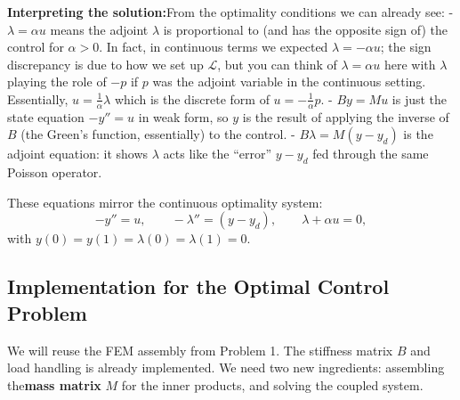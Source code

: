 \textbf{Interpreting the solution:}From the optimality conditions we can already see:
- \(\lambda = \alpha u\) means the adjoint \(\lambda\) is proportional to (and has the opposite sign of) the control for \(\alpha>0\). In fact, in continuous terms we expected \(\lambda = -\alpha u\); the sign discrepancy is due to how we set up \(\mathcal{L}\), but you can think of \(\lambda = \alpha u\) here with \(\lambda\) playing the role of \(-p\) if \(p\) was the adjoint variable in the continuous setting. Essentially, \(u = \frac{1}{\alpha}\lambda\) which is the discrete form of \(u = -\frac{1}{\alpha}p\).
- \(B y = M u\) is just the state equation \(-y'' = u\) in weak form, so \(y\) is the result of applying the inverse of \(B\) (the Green's function, essentially) to the control.
- \(B \lambda = M(y - y_d)\) is the adjoint equation: it shows \(\lambda\) acts like the “error” \(y-y_d\) fed through the same Poisson operator.

These equations mirror the continuous optimality system:
\[ -y'' = u, \qquad -\lambda'' = (y - y_d), \qquad \lambda + \alpha u = 0, \]
with \(y(0)=y(1)=\lambda(0)=\lambda(1)=0\).

\subsection{Implementation for the Optimal Control Problem}
We will reuse the FEM assembly from Problem 1. The stiffness matrix \(B\) and load handling is already implemented. We need two new ingredients: assembling the\textbf{mass matrix} \(M\) for the inner products, and solving the coupled system.

